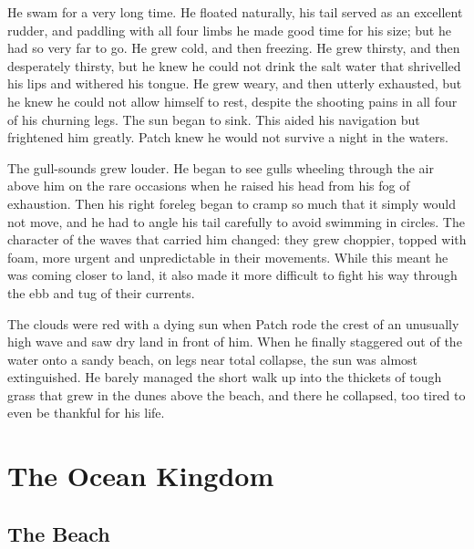 \documentclass[12pt]{book}
\begin{document}
He swam for a very long time. He floated naturally, his tail served as an excellent rudder, and paddling with all four limbs he made good time for his size; but he had so very far to go. He grew cold, and then freezing. He grew thirsty, and then desperately thirsty, but he knew he could not drink the salt water that shrivelled his lips and withered his tongue. He grew weary, and then utterly exhausted, but he knew he could not allow himself to rest, despite the shooting pains in all four of his churning legs. The sun began to sink. This aided his navigation but frightened him greatly. Patch knew he would not survive a night in the waters.\par
 The gull-sounds grew louder. He began to see gulls wheeling through the air above him on the rare occasions when he raised his head from his fog of exhaustion. Then his right foreleg began to cramp so much that it simply would not move, and he had to angle his tail carefully to avoid swimming in circles. The character of the waves that carried him changed: they grew choppier, topped with foam, more urgent and unpredictable in their movements. While this meant he was coming closer to land, it also made it more difficult to fight his way through the ebb and tug of their currents.\par
 The clouds were red with a dying sun when Patch rode the crest of an unusually high wave and saw dry land in front of him. When he finally staggered out of the water onto a sandy beach, on legs near total collapse, the sun was almost extinguished. He barely managed the short walk up into the thickets of tough grass that grew in the dunes above the beach, and there he collapsed, too tired to even be thankful for his life.\par

\chapter{The Ocean Kingdom}


\section{The Beach}
\end{document}
